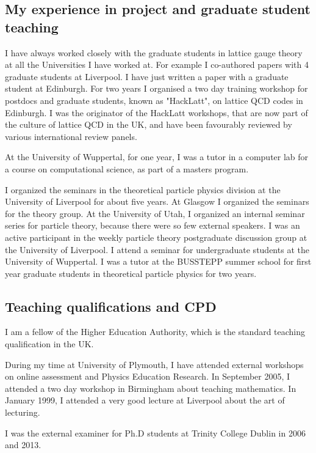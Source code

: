 \documentclass[12pt]{article}
\begin{document}
\subsection{My experience in project and graduate student teaching}


I have always worked closely with the graduate students in
lattice gauge theory at all the Universities I have worked at. 
For example I co-authored papers with 4 graduate students
at Liverpool. I have just written a paper with a graduate student
at Edinburgh.
For two years I organised a two
day training workshop for postdocs and graduate students, 
known as "HackLatt", on lattice QCD codes in
Edinburgh. I was the originator of the HackLatt workshops, that are
now part of the culture of lattice QCD in the UK, and have been favourably
reviewed by various international review panels.  


At the University of Wuppertal, for one year, I was a tutor in
a computer lab for a course on computational 
science, as part of a masters program.


I organized the seminars in the theoretical particle physics division
at the University of Liverpool for about five years. At Glasgow I
organized the seminars for the theory group.  At the University of
Utah, I organized an internal seminar series for particle theory,
because there were so few external speakers.
I was an active
participant in the weekly particle theory postgraduate discussion
group at the University of Liverpool.
I attend a seminar for undergraduate students at the University
of Wuppertal.
I was a tutor at the BUSSTEPP summer school for first year
graduate students in theoretical particle physics for two years.



\subsection{Teaching qualifications and CPD}

I am a fellow of the Higher Education Authority, which is the standard  teaching
qualification in the UK.

During my time at University of Plymouth, I have attended external workshops on online
assessment and Physics Education Research.  In September 2005, I
attended a two day workshop in Birmingham about teaching
mathematics. In January 1999, I attended a very good lecture at
Liverpool about the art of lecturing.

I was the external examiner for Ph.D students
at Trinity College Dublin in 2006 and 2013.
\end{document}
